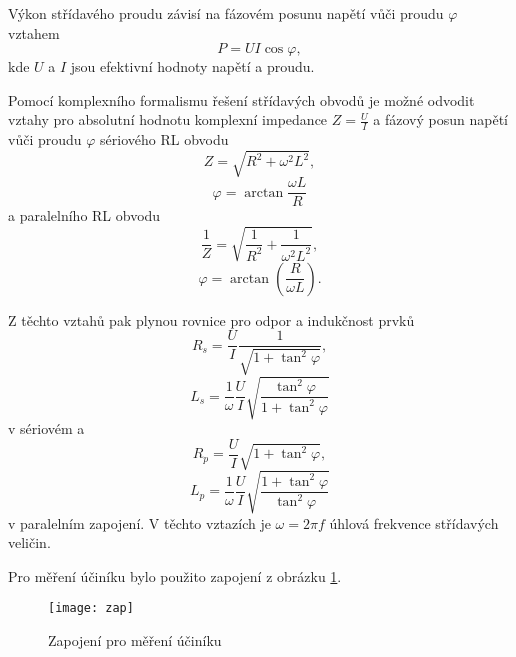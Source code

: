 \documentclass[0-protokol.tex]{subfiles}
\begin{document}
Výkon střídavého proudu závisí na fázovém posunu napětí vůči proudu $\varphi$ vztahem
\begin{equation} \label{eq:vykon}
P = UI \cos \varphi,
\end{equation}
kde $U$ a $I$ jsou efektivní hodnoty napětí a proudu.

Pomocí komplexního formalismu řešení střídavých obvodů je možné odvodit vztahy pro absolutní hodnotu komplexní impedance $Z = \frac{U}{I}$ a fázový posun napětí vůči proudu $\varphi$ sériového RL obvodu
\begin{equation}
Z = \sqrt{R^2 + \omega^2 L^2},
\end{equation}
\begin{equation}
\varphi = \arctan \frac{\omega L}{R}
\end{equation}
a paralelního RL obvodu
\begin{equation}
\frac{1}{Z} = \sqrt{\frac{1}{R^2} + \frac{1}{\omega^2 L^2}},
\end{equation}
\begin{equation}
\varphi = \arctan \left(\frac{R}{\omega L} \right).
\end{equation}

Z těchto vztahů pak plynou rovnice pro odpor a indukčnost prvků
\begin{equation} \label{eq:R_s}
R_s = \frac{U}{I}\frac{1}{\sqrt{1 + \tan^2 \varphi}},
\end{equation}
\begin{equation} \label{eq:L_s}
L_s = \frac{1}{\omega}\frac{U}{I}\sqrt{\frac{\tan^2 \varphi}{1 + \tan^2 \varphi}}
\end{equation}
v sériovém a
\begin{equation} \label{eq:R_p}
R_p = \frac{U}{I}\sqrt{1 + \tan^2 \varphi},
\end{equation}
\begin{equation} \label{eq:L_p}
L_p = \frac{1}{\omega}\frac{U}{I}\sqrt{\frac{1 + \tan^2 \varphi}{\tan^2 \varphi}}
\end{equation}
v paralelním zapojení. V těchto vztazích je $\omega = 2 \pi f$ úhlová frekvence střídavých veličin.

Pro měření účiníku bylo použito zapojení z obrázku \ref{fig:zap}.

\begin{figure}[H]
\centering
\texttt{[image: zap]}
\caption{Zapojení pro měření účiníku}
\label{fig:zap}
\end{figure}
\end{document}
